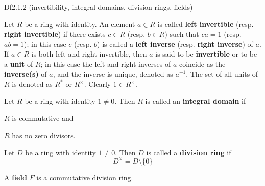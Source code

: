 \documentclass{article}
\begin{document}
\begin{Df}{Df2.1.2 (invertibility, integral domains, division rings, fields)}
    \begin{compactenum}
        \item Let $R$ be a ring with identity. An element $a \in R$ is called \textbf{left invertible} (resp. \textbf{right invertible}) if there exists $c \in R$ (resp. $b \in R$) such that $ca = 1$ (resp. $ab = 1$); in this case $c$ (resp. $b$) is called a \textbf{left inverse} (resp. \textbf{right inverse}) of $a$. If $a\in R$ is both left and right invertible, then $a$ is said to be \textbf{invertible} or to be a \textbf{unit} of $R$; \textcolor{Th}{in this case the left and right inverses of $a$ coincide as the \textbf{inverse(s)} of $a$, and the inverse is unique,} denoted as $a^{-1}$. The set of all units of $R$ is denoted as $R^\ast$ or $R^\times$. \textcolor{Th}{Clearly $1 \in R^\times$.}
        \item Let $R$ be a ring with identity $1\neq 0$. Then $R$ is called an \textbf{integral domain} if 
        \begin{compactenum}
            \item $R$ is commutative and
            \item $R$ has no zero divisors.
        \end{compactenum}
        \item Let $D$ be a ring with identity $1\neq 0$. Then $D$ is called a \textbf{division ring} if
        $$ D^\times = D \setminus \{0\} $$
        \item A \textbf{field} $F$ is a commutative division ring. 
    \end{compactenum}
\end{Df}
\end{document}
